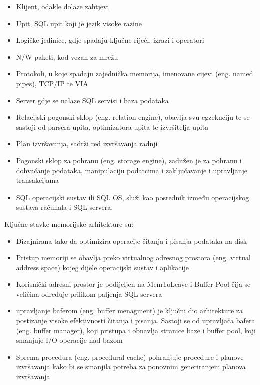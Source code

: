 \documentclass[12pt, oneside, onecolumn]{book}
\begin{document}
{\begin{itemize}
\item Klijent, odakle dolaze zahtjevi
\item Upit, SQL upit koji je jezik visoke razine
\item Logičke jedinice, gdje spadaju ključne riječi, izrazi i operatori
\item N/W paketi, kod vezan za mrežu
\item Protokoli, u koje spadaju zajednička memorija, imenovane cijevi (eng. named pipes), TCP/IP te VIA
\item Server gdje se nalaze SQL servisi i baza podataka
\item Relacijski pogonski sklop (eng. relation engine), obavlja svu egzekuciju te se sastoji od parsera upita, optimizatora upita te izvršitelja upita
\item Plan izvršavanja, sadrži red izvršavanja radnji
\item Pogonski sklop za pohranu (eng. storage engine), zadužen je za pohranu i dohvaćanje podataka, manipulaciju podatcima i zaključavanje i upravljanje transakcijama
\item SQL operacijski sustav ili SQL OS, služi kao posrednik između operacijskog sustava računala i SQL servera.
\end{itemize}

Ključne stavke memorijske arhitekture su:

\begin{itemize}
\item Dizajnirana tako da optimizira operacije čitanja i pisanja podataka na disk
\item Pristup memoriji se obavlja preko virtualnog adresnog prostora (eng. virtual address space) kojeg dijele operacijski sustav i aplikacije
\item Korisnički adresni prostor je podijeljen na MemToLeave i Buffer Pool čija se veličina određuje prilikom paljenja SQL servera
\item upravljanje baferom (eng. buffer menagment) je ključni dio arhitekture za postizanje visoke efektivnosti čitanja i pisanja. Sastoji se od upravljača bafera (eng. buffer manager), koji pristupa i obnavlja stranice baze i buffer pool, koji smanjuje I/O operacije nad bazom
\item Sprema procedura (eng. procedural cache) pohranjuje procedure i planove izvršavanja kako bi se smanjila potreba za ponovnim generiranjem planova izvršavanja
\end{itemize}

}
\end{document}
